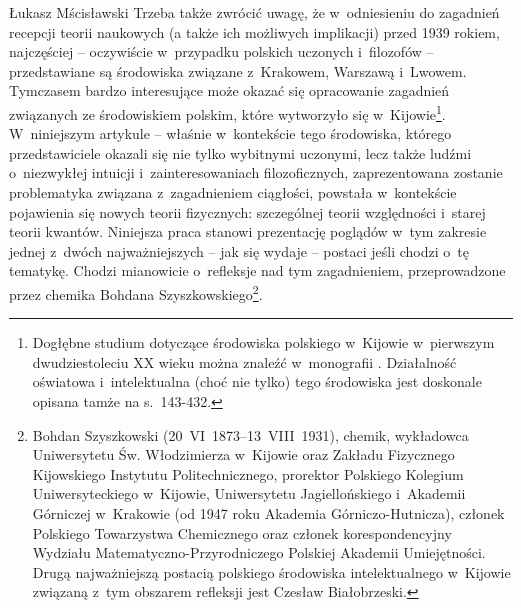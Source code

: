 \begin{artplenv}{Łukasz Mścisławski}
Trzeba także zwrócić uwagę, że w~odniesieniu do zagadnień recepcji teorii naukowych (a także ich możliwych implikacji) przed 1939 rokiem, najczęściej -- oczywiście w~przypadku polskich uczonych i~filozofów -- przedstawiane są środowiska związane z~Krakowem, Warszawą i~Lwowem. Tymczasem bardzo interesujące może okazać się opracowanie zagadnień związanych ze środowiskiem polskim, które wytworzyło się w~Kijowie\footnote{Dogłębne studium dotyczące środowiska polskiego w~Kijowie w~pierwszym dwudziestoleciu XX wieku można znaleźć w~monografii
\parencite[][]{korzeniowski_za_2009}. %
 Działalność oświatowa i~intelektualna (choć nie tylko) tego środowiska jest doskonale opisana tamże na s.~143-432.}. W~niniejszym artykule -- właśnie w~kontekście tego środowiska, którego przedstawiciele okazali się nie tylko wybitnymi uczonymi, lecz także ludźmi o~niezwykłej intuicji i~zainteresowaniach filozoficznych, zaprezentowana zostanie problematyka związana z~zagadnieniem ciągłości, powstała w~kontekście pojawienia się nowych teorii fizycznych: szczególnej teorii względności i~starej teorii kwantów. Niniejsza praca stanowi prezentację poglądów w~tym zakresie jednej z~dwóch najważniejszych -- jak się wydaje -- postaci jeśli chodzi o~tę tematykę. Chodzi mianowicie o~refleksje nad tym zagadnieniem, przeprowadzone przez chemika Bohdana Szyszkowskiego\footnote{Bohdan Szyszkowski (20~VI~1873–13~VIII~1931), chemik, wykładowca Uniwersytetu Św. Włodzimierza w~Kijowie oraz Zakładu Fizycznego Kijowskiego Instytutu Politechnicznego, prorektor Polskiego Kolegium Uniwersyteckiego w~Kijowie, Uniwersytetu Jagiellońskiego i~Akademii Górniczej w~Krakowie (od 1947 roku Akademia Górniczo-Hutnicza), członek Polskiego Towarzystwa Chemicznego oraz członek korespondencyjny Wydziału Matematyczno-Przyrodniczego Polskiej Akademii Umiejętności. Drugą najważniejszą postacią polskiego środowiska intelektualnego w~Kijowie związaną z~tym obszarem refleksji jest Czesław Białobrzeski.}.


\end{artplenv}
